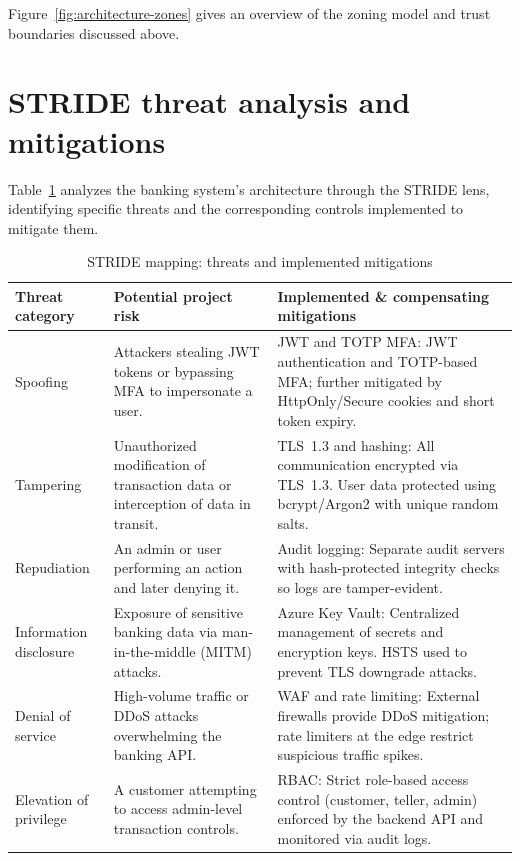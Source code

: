 Figure~\ref{fig:architecture-zones} gives an overview of the zoning model and trust boundaries discussed above.

\section{STRIDE threat analysis and mitigations}

Table~\ref{tab:stride} analyzes the banking system's architecture through the STRIDE lens, identifying specific threats and the corresponding controls implemented to mitigate them.

\begin{table}[htbp]
  \centering
  \caption{STRIDE mapping: threats and implemented mitigations}
  \label{tab:stride}
  \small
  \setlength{\tabcolsep}{6pt}
  \renewcommand{\arraystretch}{1.25}
  \begin{tabularx}{\textwidth}{@{} >{\raggedright\arraybackslash}p{3.1cm} X X @{}}
    \toprule
    \textbf{Threat category} &
      \textbf{Potential project risk} &
      \textbf{Implemented \& compensating mitigations} \\
    \midrule
    Spoofing &
      Attackers stealing JWT tokens or bypassing MFA to impersonate a user. &
      JWT and TOTP MFA: JWT authentication and TOTP-based MFA; further mitigated by HttpOnly/Secure cookies and short token expiry. \\
    Tampering &
      Unauthorized modification of transaction data or interception of data in transit. &
      TLS~1.3 and hashing: All communication encrypted via TLS~1.3. User data protected using bcrypt/Argon2 with unique random salts. \\
    Repudiation &
      An admin or user performing an action and later denying it. &
      Audit logging: Separate audit servers with hash-protected integrity checks so logs are tamper-evident. \\
    Information disclosure &
      Exposure of sensitive banking data via man-in-the-middle (MITM) attacks. &
      Azure Key Vault: Centralized management of secrets and encryption keys. HSTS used to prevent TLS downgrade attacks. \\
    Denial of service &
      High-volume traffic or DDoS attacks overwhelming the banking API. &
      WAF and rate limiting: External firewalls provide DDoS mitigation; rate limiters at the edge restrict suspicious traffic spikes. \\
    Elevation of privilege &
      A customer attempting to access admin-level transaction controls. &
      RBAC: Strict role-based access control (customer, teller, admin) enforced by the backend API and monitored via audit logs. \\
    \bottomrule
  \end{tabularx}
\end{table}

